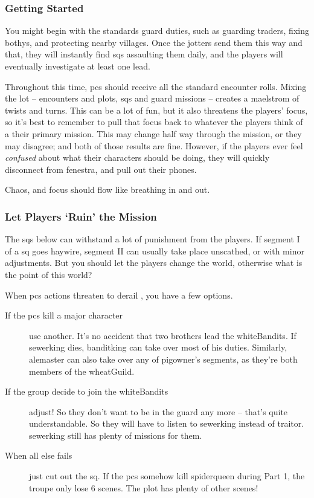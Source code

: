 \begin{multicols}{2}
\subsubsection{Getting Started}

You might begin with the standards \gls{guard} duties,%
such as guarding traders, fixing \glspl{bothy}, and protecting nearby \glspl{village}.
Once the \glspl{jotter} send them this way and that, they will instantly find \glspl{sq} assaulting them daily, and the players will eventually investigate at least one lead.

Throughout this time, \glspl{pc} should receive all the standard encounter rolls.
Mixing the lot -- encounters and plots, \glspl{sq} and \gls{guard} missions -- creates a maelstrom of twists and turns.
This can be a lot of fun, but it also threatens the players' focus, so it's best to remember to pull that focus back to whatever the players think of a their primary mission.
This may change half way through the mission, or they may disagree; and both of those results are fine.
However, if the players ever feel \emph{confused} about what their characters should be doing, they will quickly disconnect from \gls{fenestra}, and pull out their phones.

Chaos, and focus should flow like breathing in and out.

\subsubsection{Let Players `Ruin' the Mission}

The \glspl{sq} below can withstand a lot of punishment from the players.
If \gls{segment} I of a \gls{sq} goes haywire, \gls{segment} II can usually take place unscathed, or with minor adjustments.
But you should let the players change the world, otherwise what is the point of this world?

When \glspl{pc} actions threaten to derail , you have a few options.

\begin{description}
  \item[If the \glspl{pc} kill a major character]
  use another.
  It's no accident that two brothers lead the \gls{whiteBandits}.
  If \gls{sewerking} dies, \gls{banditking} can take over most of his duties.
  Similarly, \gls{alemaster} can also take over any of \gls{pigowner}'s \glspl{segment}, as they're both members of the \gls{wheatGuild}.
  \item[If the group decide to join the \gls{whiteBandits}]
  adjust!
  So they don't want to be in the \gls{guard} any more -- that's quite understandable.
  So they will have to listen to \gls{sewerking} instead of \gls{traitor}.
  \Gls{sewerking} still has plenty of missions for them.
  \item[When all else fails]
  just cut out the \gls{sq}.
  If the \glspl{pc} somehow kill \gls{spiderqueen} during Part 1, the troupe only lose 6 scenes.
  The plot has plenty of other scenes!
\end{description}

\end{multicols}


